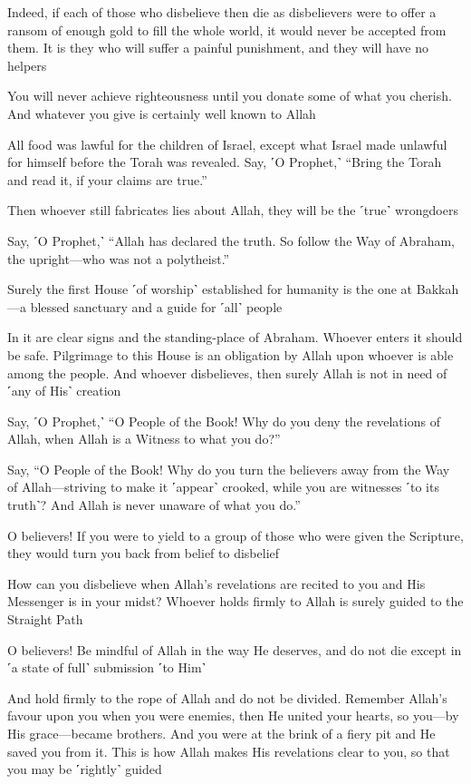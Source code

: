 Indeed, if each of those who disbelieve then die as disbelievers were to offer a ransom of enough gold to fill the whole world, it would never be accepted from them. It is they who will suffer a painful punishment, and they will have no helpers

You will never achieve righteousness until you donate some of what you cherish. And whatever you give is certainly well known to Allah

All food was lawful for the children of Israel, except what Israel made unlawful for himself before the Torah was revealed. Say, ˹O Prophet,˺ “Bring the Torah and read it, if your claims are true.”

Then whoever still fabricates lies about Allah, they will be the ˹true˺ wrongdoers

Say, ˹O Prophet,˺ “Allah has declared the truth. So follow the Way of Abraham, the upright—who was not a polytheist.”

Surely the first House ˹of worship˺ established for humanity is the one at Bakkah—a blessed sanctuary and a guide for ˹all˺ people

In it are clear signs and the standing-place of Abraham. Whoever enters it should be safe. Pilgrimage to this House is an obligation by Allah upon whoever is able among the people. And whoever disbelieves, then surely Allah is not in need of ˹any of His˺ creation

Say, ˹O Prophet,˺ “O People of the Book! Why do you deny the revelations of Allah, when Allah is a Witness to what you do?”

Say, “O People of the Book! Why do you turn the believers away from the Way of Allah—striving to make it ˹appear˺ crooked, while you are witnesses ˹to its truth˺? And Allah is never unaware of what you do.”

O believers! If you were to yield to a group of those who were given the Scripture, they would turn you back from belief to disbelief

How can you disbelieve when Allah’s revelations are recited to you and His Messenger is in your midst? Whoever holds firmly to Allah is surely guided to the Straight Path

O believers! Be mindful of Allah in the way He deserves, and do not die except in ˹a state of full˺ submission ˹to Him˺

And hold firmly to the rope of Allah and do not be divided. Remember Allah’s favour upon you when you were enemies, then He united your hearts, so you—by His grace—became brothers. And you were at the brink of a fiery pit and He saved you from it. This is how Allah makes His revelations clear to you, so that you may be ˹rightly˺ guided

